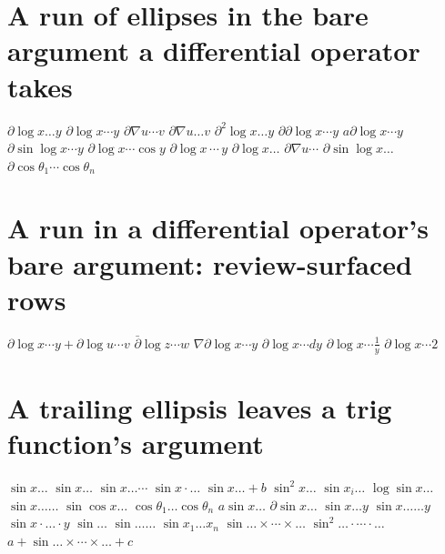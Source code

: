 \documentclass{article}
\begin{document}
\section{A run of ellipses in the bare argument a differential operator takes}
$\partial\log x\ldots y$ $\partial\log x\cdots y$ $\partial\nabla u\cdots v$ $\partial\nabla u\ldots v$ $\partial^2\log x\ldots y$
$\partial\partial\log x\cdots y$ $a\partial\log x\cdots y$ $\partial\sin\log x\cdots y$ $\partial\log x\cdots\cos y$
$\partial\log x\,\cdots\,y$ $\partial\log x\ldots$ $\partial\nabla u\cdots$ $\partial\sin\log x\ldots$
$\partial\cos\theta_1\cdots\cos\theta_n$

\section{A run in a differential operator's bare argument: review-surfaced rows}
$\partial\log x\cdots y+\partial\log u\cdots v$ $\bar\partial\log z\cdots w$ $\nabla\partial\log x\cdots y$
$\partial\log x\cdots dy$ $\partial\log x\cdots\frac{1}{y}$ $\partial\log x\cdots 2$

\section{A trailing ellipsis leaves a trig function's argument}
$\sin x\ldots$ $\sin x\dots$ $\sin x\ldots\cdots$ $\sin x\cdot\ldots$ $\sin x\ldots+b$ $\sin^2 x\ldots$ $\sin x_i\ldots$
$\log\sin x\ldots$ $\sin x\ldots\ldots$ $\sin\cos x\ldots$ $\cos\theta_1\ldots\cos\theta_n$ $a\sin x\ldots$ $\partial\sin x\ldots$
$\sin x\ldots y$ $\sin x\ldots\ldots y$ $\sin x\cdot\ldots\cdot y$ $\sin\ldots$ $\sin\ldots\ldots$ $\sin x_1\ldots x_n$
$\sin\ldots\times\cdots\times\ldots$ $\sin^2\ldots\cdot\cdots\cdot\ldots$ $a+\sin\ldots\times\cdots\times\ldots+c$
\end{document}
